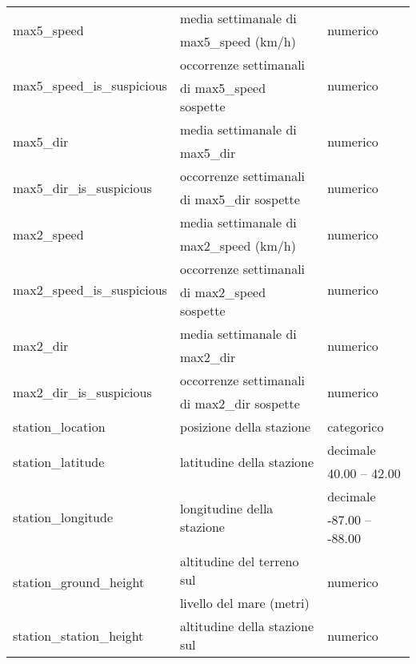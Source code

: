 \begin{longtable}{lll}
	\multirow{2}{*}{max5\_speed}	& media settimanale di  & 
	\multirow{2}{*}{numerico}	\\
	& max5\_speed (km/h) &\\\hline	
	\multirow{2}{*}{max5\_speed\_is\_suspicious}		& occorrenze 
	settimanali & \multirow{2}{*}{numerico}	\\
	& di max5\_speed sospette &  \\	\hline		
	\multirow{2}{*}{max5\_dir} & media settimanale di  & 	
	\multirow{2}{*}{numerico} \\
	&max5\_dir&\\ \hline
	\multirow{2}{*}{max5\_dir\_is\_suspicious}		& occorrenze settimanali & 
	\multirow{2}{*}{numerico}	\\
	& di max5\_dir sospette & \\ \hline	
	\multirow{2}{*}{max2\_speed}	& media settimanale di 	 & 	
	\multirow{2}{*}{numerico}	\\ 
	& max2\_speed (km/h) &\\	\hline		
	\multirow{2}{*}{max2\_speed\_is\_suspicious} & occorrenze settimanali & 
	\multirow{2}{*}{numerico}	\\
	& di max2\_speed sospette &  \\	\hline			
	\multirow{2}{*}{max2\_dir}	& media settimanale di  & 		
	\multirow{2}{*}{numerico} \\ 
	& max2\_dir & \\ \hline
	\multirow{2}{*}{max2\_dir\_is\_suspicious}		& occorrenze settimanali & 
	\multirow{2}{*}{numerico}	\\
	& di max2\_dir sospette &  \\ \hline
	station\_location & posizione della stazione & categorico \\	\hline
	\multirow{2}{*}{station\_latitude}	& \multirow{2}{*}{latitudine della 
		stazione}	&  decimale    \\ 
	& & {40.00} -- {42.00}  \\ \hline
	\multirow{2}{*}{station\_longitude}	& \multirow{2}{*}{longitudine della 
		stazione} 	&  decimale     \\ 
	& & {-87.00} -- {-88.00} \\ \hline 
	\multirow{2}{*}{station\_ground\_height}	& 	altitudine del terreno sul  
	& 	\multirow{2}{*}{numerico}	\\
	& livello del mare (metri) &\\ \hline		
	\multirow{2}{*}{station\_station\_height}	& 	altitudine della stazione 
	sul  &	\multirow{2}{*}{numerico} 	\\

\end{longtable}
